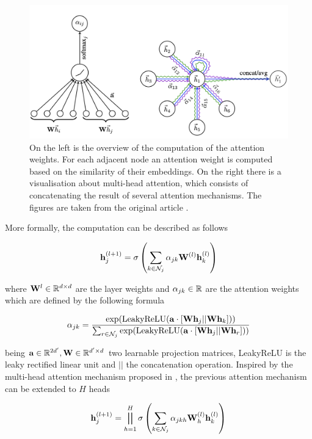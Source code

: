 \begin{figure}[ht]
    \centering
    \includegraphics[width=\textwidth]{imgs/gat.png}
    \caption{On the left is the overview of the computation of the attention weights. For each adjacent node an attention weight is computed based on the similarity of their embeddings. On the right there is a visualisation about multi-head attention, which consists of concatenating the result of several attention mechanisms. The figures are taken from the original article \cite{graphatt}.}
    \label{fig:gat}
\end{figure}

More formally, the computation can be described as follows

\begin{equation}
    {\mathbf h}_j^{(l+1)} = \sigma \left(\sum_{k \in \mathcal{N}_j} \alpha_{jk} {\mathbf W}^{(l)}{\mathbf h}_k^{(l)}\right)
\end{equation}

\noindent where ${\mathbf W}^{l}\in \mathbb{R}^{d\times d}$ are the layer weights and $\alpha_{jk} \in \mathbb{R}$ are the attention weights which are defined by the following formula

\begin{equation}
    \alpha_{jk} = \frac{\exp(\text{LeakyReLU}({\mathbf a} \cdot [{\mathbf W} {\mathbf h}_j||{\mathbf W} {\mathbf h}_k]))}{\sum_{r\in \mathcal{N}_j} \exp(\text{LeakyReLU}({\mathbf a} \cdot [{\mathbf W} {\mathbf h}_j||{\mathbf W} {\mathbf h}_r]))}
\end{equation}

\noindent being ${\mathbf a} \in \mathbb{R}^{2d'}, {\mathbf W} \in \mathbb{R}^{d'\times d}$ two learnable projection matrices, LeakyReLU is the leaky rectified linear unit \cite{leakyrelu} and $||$ the concatenation operation. Inspired by the multi-head attention mechanism proposed in \cite{transformer}, the previous attention mechanism can be extended to $H$ heads

\begin{equation}
    {\mathbf h}_j^{(l+1)} = \bigparallel_{h=1}^H \sigma \left(\sum_{k \in \mathcal{N}_j} \alpha_{jkh} {\mathbf W}^{(l)}_h{\mathbf h}_k^{(l)}\right)
\end{equation}

